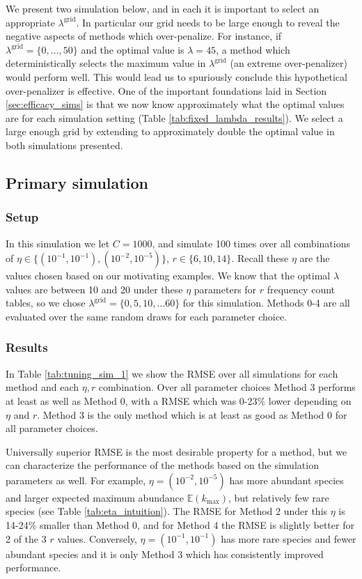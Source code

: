 \documentclass[oupdraft]{bio}
\newcommand{\lambdagrid}{\lambda^{\text{grid}}}
\begin{document}
We present two simulation below, and in each it is important to select an appropriate $\lambdagrid$.  In particular our grid needs to be large enough to reveal the negative aspects of methods which over-penalize.  For instance, if $\lambdagrid = \{0, \dots , 50\}$ and the optimal value is $\lambda = 45$, a method which deterministically selects the maximum value in $\lambdagrid$ (an extreme over-penalizer) would perform well.  This would lead us to spuriously conclude this hypothetical over-penalizer is effective.  One of the important foundations laid in Section \ref{sec:efficacy_sims} is that we now know approximately what the optimal values are for each simulation setting (Table \ref{tab:fixed_lambda_results}).  We select a large enough grid by extending to approximately double the optimal value in both simulations presented.

\subsection{Primary simulation}
\label{sec:tuning_simulation_1}

\subsubsection{Setup}

In this simulation we let $C = 1000$, and simulate 100 times over all combinations of $\eta \in \{(10^{-1}, 10^{-1}), (10^{-2}, 10^{-5}) \}$, $r \in \{6, 10, 14\}$.  Recall these $\eta$ are the values chosen based on our motivating examples.  We know that the optimal $\lambda$ values are between 10 and 20 under these $\eta$ parameters for $r$ frequency count tables, so we chose $\lambdagrid = \{0, 5, 10, \dots 60\}$ for this simulation.  Methods 0-4 are all evaluated over the same random draws for each parameter choice.

\subsubsection{Results}

In Table \ref{tab:tuning_sim_1} we show the RMSE over all simulations for each method and each $\eta, r$ combination.  Over all parameter choices Method 3 performs at least as well as Method 0, with a RMSE which was 0-23\% lower depending on $\eta$ and $r$.  Method 3 is the only method which is at least as good as Method 0 for all parameter choices.

Universally superior RMSE is the most desirable property for a method, but we can characterize the performance of the methods based on the simulation parameters as well.  For example, $\eta = (10^{-2},10^{-5})$ has more abundant species and larger expected maximum abundance $\mathbb{E}(k_{\text{max}})$, but relatively few rare species (see Table \ref{tab:eta_intuition}).  The RMSE for Method 2 under this $\eta$ is 14-24\% smaller than Method 0, and for Method 4 the RMSE is slightly better for 2 of the 3 $r$ values.  Conversely, $\eta = (10^{-1}, 10^{-1})$ has more rare species and fewer abundant species and it is only Method 3 which has consistently improved performance.
\end{document}
